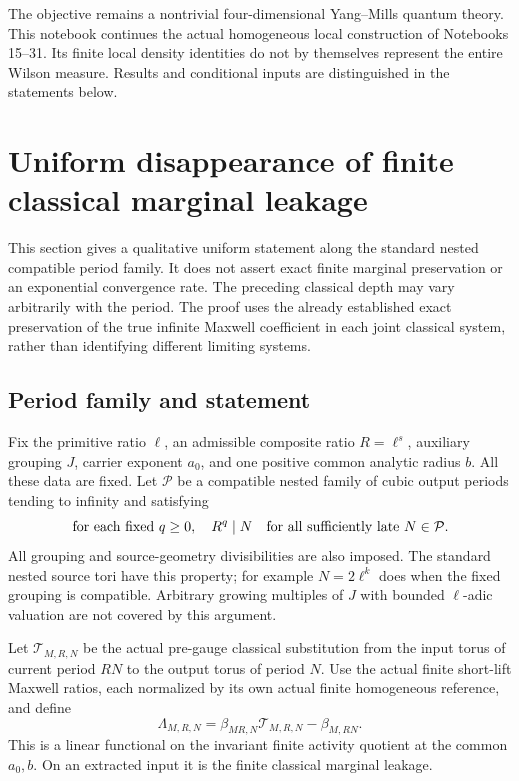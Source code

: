 \documentclass[11pt]{article}
\theoremstyle{remark}
\begin{document}
The objective remains a nontrivial four-dimensional Yang--Mills
quantum theory. This notebook continues the actual homogeneous
local construction of Notebooks 15--31. Its finite local density
identities do not by themselves represent the entire Wilson
measure. Results and conditional inputs are distinguished in
the statements below.


\section{Uniform disappearance of finite classical marginal leakage}
\label{fml-section}

This section gives a qualitative uniform statement along the
standard nested compatible period family. It does not assert
exact finite marginal preservation or an exponential convergence
rate. The preceding classical depth may vary arbitrarily with
the period. The proof uses the already established exact
preservation of the true infinite Maxwell coefficient in each
joint classical system, rather than identifying different
limiting systems.

\subsection{Period family and statement}
\label{fml-setup-section}

Fix the primitive ratio \(\ell\), an admissible composite ratio
\(R=\ell^s\), auxiliary grouping \(J\), carrier exponent \(a_0\),
and one positive common analytic radius \(b\). All these data
are fixed. Let \(\mathcal P\) be a compatible nested family of
cubic output periods tending to infinity and satisfying
\begin{equation}
 \text{for each fixed }q\ge0,\quad
 R^q\mid N\quad\hbox{for all sufficiently late }N\in\mathcal P.
 \label{fml-divisibility}
\end{equation}
All grouping and source-geometry divisibilities are also
imposed. The standard nested source tori have this property;
for example \(N=2\ell^k\) does when the fixed grouping is
compatible. Arbitrary growing multiples of \(J\) with bounded
\(\ell\)-adic valuation are not covered by this argument.

Let \(\mathcal T_{M,R,N}\) be the actual pre-gauge classical
substitution from the input torus of current period \(RN\)
to the output torus of period \(N\). Use the actual finite
short-lift Maxwell ratios, each normalized by its own actual
finite homogeneous reference, and define
\begin{equation}
 \Lambda_{M,R,N}
   =\beta_{MR,N}\mathcal T_{M,R,N}-\beta_{M,RN}.
 \label{fml-leakage}
\end{equation}
This is a linear functional on the invariant finite activity
quotient at the common \(a_0,b\). On an extracted input it
is the finite classical marginal leakage.
\end{document}

